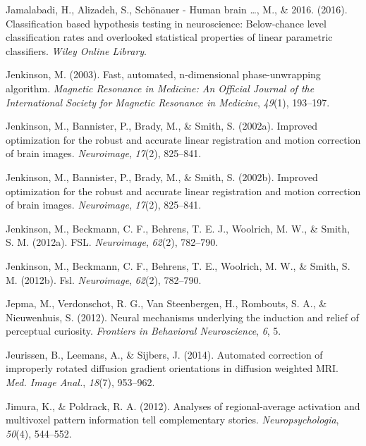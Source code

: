 \documentclass[11pt,american,]{memoir} %
\begin{document}
\leavevmode\hypertarget{ref-Jamalabadi2016-gr}{}%
Jamalabadi, H., Alizadeh, S., Schönauer - Human brain \ldots, M., \& 2016. (2016). Classification based hypothesis testing in neuroscience: Below‐chance level classification rates and overlooked statistical properties of linear parametric classifiers. \emph{Wiley Online Library}.

\leavevmode\hypertarget{ref-jenkinson2003fast}{}%
Jenkinson, M. (2003). Fast, automated, n-dimensional phase-unwrapping algorithm. \emph{Magnetic Resonance in Medicine: An Official Journal of the International Society for Magnetic Resonance in Medicine}, \emph{49}(1), 193--197.

\leavevmode\hypertarget{ref-jenkinson2002improved}{}%
Jenkinson, M., Bannister, P., Brady, M., \& Smith, S. (2002a). Improved optimization for the robust and accurate linear registration and motion correction of brain images. \emph{Neuroimage}, \emph{17}(2), 825--841.

\leavevmode\hypertarget{ref-Jenkinson2002-wm}{}%
Jenkinson, M., Bannister, P., Brady, M., \& Smith, S. (2002b). Improved optimization for the robust and accurate linear registration and motion correction of brain images. \emph{Neuroimage}, \emph{17}(2), 825--841.

\leavevmode\hypertarget{ref-Jenkinson2012-ui}{}%
Jenkinson, M., Beckmann, C. F., Behrens, T. E. J., Woolrich, M. W., \& Smith, S. M. (2012a). FSL. \emph{Neuroimage}, \emph{62}(2), 782--790.

\leavevmode\hypertarget{ref-jenkinson2012fsl}{}%
Jenkinson, M., Beckmann, C. F., Behrens, T. E., Woolrich, M. W., \& Smith, S. M. (2012b). Fsl. \emph{Neuroimage}, \emph{62}(2), 782--790.

\leavevmode\hypertarget{ref-jepma2012neural}{}%
Jepma, M., Verdonschot, R. G., Van Steenbergen, H., Rombouts, S. A., \& Nieuwenhuis, S. (2012). Neural mechanisms underlying the induction and relief of perceptual curiosity. \emph{Frontiers in Behavioral Neuroscience}, \emph{6}, 5.

\leavevmode\hypertarget{ref-Jeurissen2014-cd}{}%
Jeurissen, B., Leemans, A., \& Sijbers, J. (2014). Automated correction of improperly rotated diffusion gradient orientations in diffusion weighted MRI. \emph{Med. Image Anal.}, \emph{18}(7), 953--962.

\leavevmode\hypertarget{ref-Jimura2012-lv}{}%
Jimura, K., \& Poldrack, R. A. (2012). Analyses of regional-average activation and multivoxel pattern information tell complementary stories. \emph{Neuropsychologia}, \emph{50}(4), 544--552.
\end{document}
